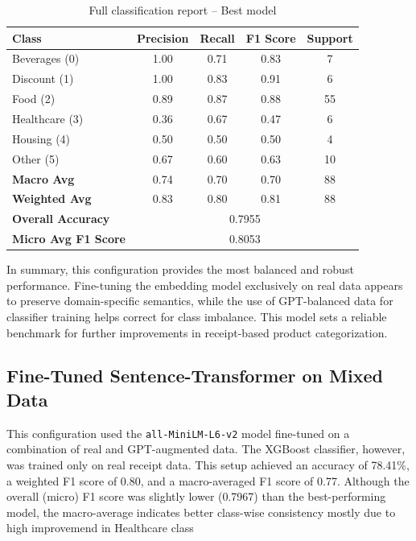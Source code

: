 \documentclass{SGGW-thesis-EN}
\begin{document}
\begin{table}[h!]
  \centering
  \caption{Full classification report – Best model}
  \label{tab:best_model_report}
  \begin{tabularx}{\textwidth}{lcccc}
    \toprule
    \textbf{Class} & \textbf{Precision} & \textbf{Recall} & \textbf{F1 Score} & \textbf{Support} \\
    \midrule
    Beverages (0)     & 1.00 & 0.71 & 0.83 & 7 \\
    Discount (1)      & 1.00 & 0.83 & 0.91 & 6 \\
    Food (2)          & 0.89 & 0.87 & 0.88 & 55 \\
    Healthcare (3)    & 0.36 & 0.67 & 0.47 & 6 \\
    Housing (4)       & 0.50 & 0.50 & 0.50 & 4 \\
    Other (5)         & 0.67 & 0.60 & 0.63 & 10 \\
    \midrule
    \textbf{Macro Avg}         & 0.74  & 0.70  & 0.70 & 88 \\
    \textbf{Weighted Avg}      & 0.83  & 0.80  & 0.81 & 88 \\
    \textbf{Overall Accuracy}  & \multicolumn{4}{c}{0.7955} \\
    \textbf{Micro Avg F1 Score}& \multicolumn{4}{c}{0.8053} \\
    \bottomrule
  \end{tabularx}
\end{table}

In summary, this configuration provides the most balanced and robust performance. Fine-tuning the embedding model exclusively on real data  
appears to preserve domain-specific semantics, while the use of GPT-balanced data for classifier training helps correct for class imbalance.  
This model sets a reliable benchmark for further improvements in receipt-based product categorization.

\subsection{Fine-Tuned Sentence-Transformer on Mixed Data}

This configuration used the \texttt{all-MiniLM-L6-v2} model fine-tuned on a combination of real and GPT-augmented data. The XGBoost classifier,  
however, was trained only on real receipt data. This setup achieved an accuracy of 78.41\%, a weighted F1 score of 0.80, and a macro-averaged  
F1 score of 0.77. Although the overall (micro) F1 score was slightly lower (0.7967) than the best-performing model, the macro-average indicates  
better class-wise consistency mostly due to high improvemend in Healthcare class
\end{document}
